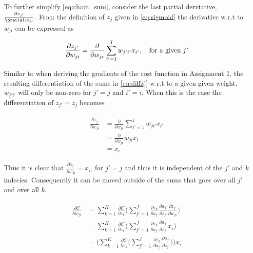 \documentclass{article}
\begin{document}
To further simplify \eqref{eq:chain_sum}, consider the last partial derviative, $\frac{\partial z_{j'}}{\pratial w_{ji}}$. From the definition of $z_j$ given in \eqref{eq:sigmoid} the derivative w.r.t to $w_{ji}$ can be expressed as

\begin{equation}
    \frac{\partial z_{j'}}{\partial w_{ji}} = \frac{\partial}{\partial w_{ji}} \sum_{i'=1}^I w_{j'i'}x_{i'}, \quad \text{for a given \textit{j'}}
    \label{eq:diffzj}
\end{equation}

Similar to when deriving the gradients of the cost function in Assignment 1, the resulting differentiation of the sums in \eqref{eq:diffzj} w.r.t to a given given weight, $w_{j'i'}$ will only be non-zero for $j' = j$ and $i' = i$. When this is the case the differentiation of $z_{j'} = z_j$ becomes

\begin{align}
\begin{split}
    \frac{\partial z_{j}}{\partial w_{ji}} &= \frac{\partial }{\partial w_{ji}} \sum_{i'=1}^I w_{ji'}x_{i'} \\
    &= \frac{\partial}{\partial w_{ji}} w_{ji}x_i \\
    &= x_i
\end{split}
\label{eq:diffzjdone}
\end{align}
 
 Thus it is clear that $\frac{\partial z_{j'}}{\partial w_{ji}} = x_i$, for $j' = j$ and thus it is independent of the $j'$ and $k$ indecies. Consequently it can be moved outside of the sums that goes over all $j'$ and over all $k$.
 
\begin{align}
\begin{split}
    \frac{\partial C}{\partial w_{ji}} &= \sum_{k=1}^K \frac{\partial C}{\partial z_k}\Bigg( \sum_{j'=1}^J \frac{\partial z_k}{\partial a_{j'}}\frac{\partial a_{j'}}{\partial z_{j'}}\frac{\partial z_{j'}}{\partial w_{ji}} \Bigg) \\
    &=  \sum_{k=1}^K \frac{\partial C}{\partial z_k}\Bigg( \sum_{j'=1}^J \frac{\partial z_k}{\partial a_{j'}}\frac{\partial a_{j'}}{\partial z_{j'}}x_i \Bigg) \\
    &=  \Bigg(\sum_{k=1}^K \frac{\partial C}{\partial z_k}\Bigg( \sum_{j'=1}^J \frac{\partial z_k}{\partial a_{j'}}\frac{\partial a_{j'}}{\partial z_{j'}}\Bigg)\Bigg) x_i
    \label{eq:movexiout}
\end{split}
\end{align}
\end{document}
